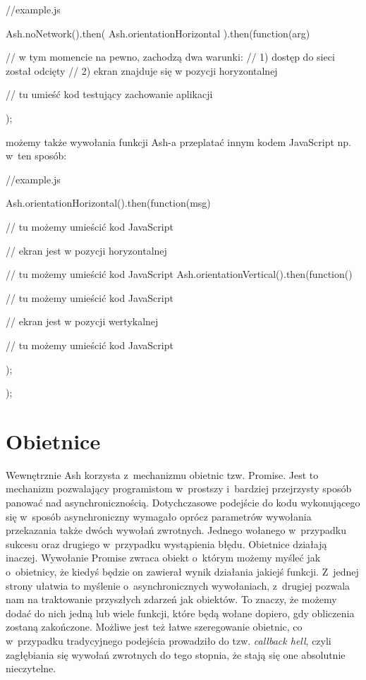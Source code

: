 \documentclass{xmgr}
\begin{document}
\begin{javascriptcode}
    //example.js

    Ash.noNetwork().then(
	    Ash.orientationHorizontal
    ).then(function(arg){
      	//  w tym momencie na pewno, zachodzą dwa warunki: 
      	//  1) dostęp do sieci został odcięty  
      	//  2) ekran znajduje się w pozycji horyzontalnej 

      	// tu umieść kod testujący zachowanie aplikacji  
    });
\end{javascriptcode}

możemy także wywołania funkcji Ash-a przeplatać innym kodem JavaScript np. w~ten sposób:

\begin{javascriptcode}
    //example.js

    Ash.orientationHorizontal().then(function(msg){
	//  tu możemy umieścić kod JavaScript 
      	
	// ekran jest w pozycji horyzontalnej
      
	//  tu możemy umieścić kod JavaScript 
      	Ash.orientationVertical().then(function(){
		//  tu możemy umieścić kod JavaScript 

		// ekran jest w pozycji wertykalnej 

		//  tu możemy umieścić kod JavaScript 
      	});
    });
\end{javascriptcode}

\section{Obietnice}\label{promise}

Wewnętrznie Ash korzysta z~mechanizmu obietnic tzw. Promise. Jest to mechanizm pozwalający programistom w~prostszy i~bardziej przejrzysty sposób panować nad asynchronicznością. Dotychczasowe podejście do kodu wykonującego się w~sposób asynchroniczny wymagało oprócz parametrów wywołania przekazania także dwóch wywołań zwrotnych. Jednego wołanego w~przypadku sukcesu oraz drugiego w~przypadku wystąpienia błędu. Obietnice działają inaczej. Wywołanie Promise zwraca obiekt o~którym możemy myśleć jak o~obietnicy, że kiedyś będzie on zawierał wynik działania jakiejś funkcji. Z~jednej strony ułatwia to myślenie o~asynchronicznych wywołaniach, z~drugiej pozwala nam na traktowanie przyszłych zdarzeń jak obiektów. To znaczy, że możemy dodać do nich jedną lub wiele funkcji, które będą wołane dopiero, gdy obliczenia zostaną zakończone. Możliwe jest też łatwe szeregowanie obietnic, co w~przypadku tradycyjnego podejścia prowadziło do tzw. \textit{callback hell}, czyli zagłębiania się wywołań zwrotnych do tego stopnia, że stają się one absolutnie nieczytelne. 
\end{document}
